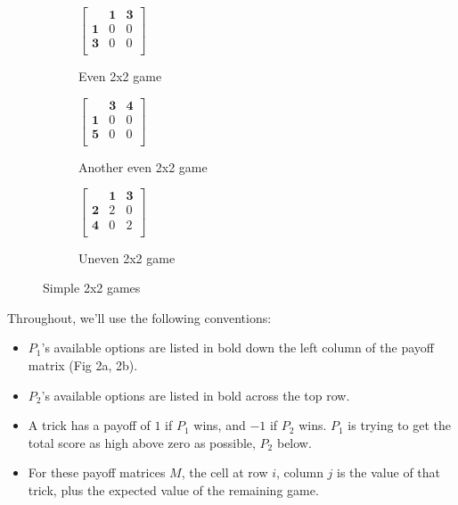 \documentclass[11pt, oneside]{article} 	%
\begin{document}
\begin{figure}
\centering
\begin{subfigure}{.5\textwidth}
  \centering
$ \left[\begin{array}{ccc}
                        & \mathbf{1} & \mathbf{3}\\ 
                       \mathbf{1} & 0 & 0\\
                        \mathbf{3} & 0 & 0\\
                      \end{array}\right] 
$
  \caption{Even 2x2 game}
\label{fig:even_2x2}
\end{subfigure}

\begin{subfigure}{.5\textwidth}
  \centering
$ \left[\begin{array}{ccc}
                        & \mathbf{3} & \mathbf{4}\\ 
                       \mathbf{1} & 0 & 0\\
                        \mathbf{5} & 0 & 0\\
                      \end{array}\right] 
$
  \caption{Another even 2x2 game}
\label{fig:another_even_2x2}
\end{subfigure}

\begin{subfigure}{.5\textwidth}
  \centering
$ \left[\begin{array}{ccc}
                        & \mathbf{1} & \mathbf{3}\\ 
                       \mathbf{2} & 2 & 0\\
                        \mathbf{4} & 0 & 2\\
                      \end{array}\right] 
$
  \caption{Uneven 2x2 game}
\label{fig:uneven_2x2}
\end{subfigure}
\caption{Simple 2x2 games}
\label{fig:2x2}
\end{figure}

Throughout, we'll use the following conventions:
\begin{itemize}
\item $P_1$'s available options are listed in bold down the left column of the payoff matrix (Fig 2a, 2b).
\item $P_2$'s available options are listed in bold across the top row.
\item A trick has a payoff of $1$ if $P_1$ wins, and $-1$ if $P_2$ wins.  $P_1$ is trying to get the total score as high above zero as possible, $P_2$ below.
\item For these payoff matrices $M$, the cell at row $i$, column $j$ is the value of that trick, plus the expected value of the remaining game.
\end{itemize}
\end{document}
